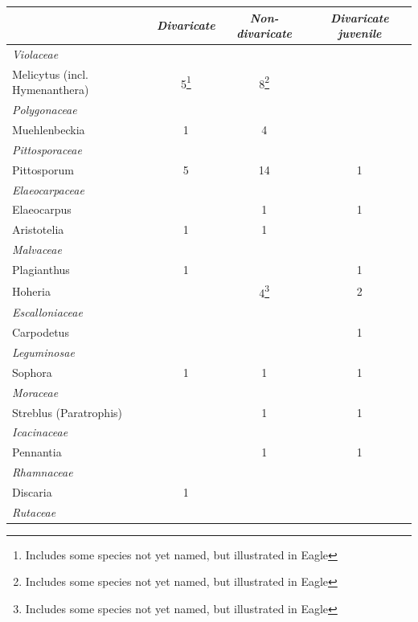 \begin{xltabular}{\textwidth}{ X c c c }
    \toprule
    & \emph{Divaricate} & \emph{Non-divaricate} & \emph{Divaricate juvenile}\\
    \midrule
    \endhead%
    \emph{Violaceae} \\
    \hspace{3mm}Melicytus (incl.
Hymenanthera)
    & 5\footnote{Includes some species not yet named, but illustrated in Eagle}
    & 8\footnote{Includes some species not yet named, but illustrated in Eagle} \\
    \emph{Polygonaceae} \\
    \hspace{3mm}Muehlenbeckia & 1 & 4 \\
    \emph{Pittosporaceae} \\
    \hspace{3mm}Pittosporum & 5 & 14 & 1\\
    \emph{Elaeocarpaceae} \\
    \hspace{3mm}Elaeocarpus &  & 1 & 1\\
    \hspace{3mm}Aristotelia & 1 & 1 \\
    \emph{Malvaceae} \\
    \hspace{3mm}Plagianthus & 1 & & 1\\
    \hspace{3mm}Hoheria & 
    & 4\footnote{Includes some species not yet named, but illustrated in Eagle}
    & 2\\
    \emph{Escalloniaceae} \\
    \hspace{3mm}Carpodetus &  &  & 1\\
    \emph{Leguminosae} \\
    \hspace{3mm}Sophora & 1 & 1 & 1\\
    \emph{Moraceae} \\
    \hspace{3mm}Streblus (Paratrophis) &  & 1 & 1\\
    \emph{Icacinaceae} \\
    \hspace{3mm}Pennantia &  & 1 & 1\\
    \emph{Rhamnaceae} \\
    \hspace{3mm}Discaria & 1 \\
    \emph{Rutaceae} \\

\end{xltabular}
